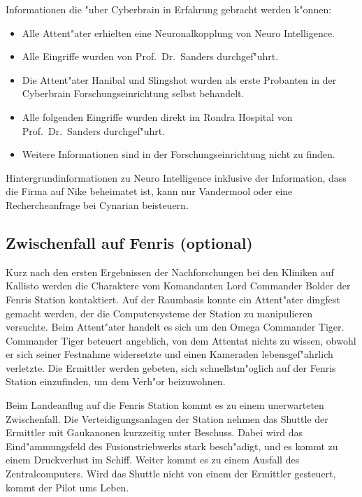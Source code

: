 Informationen die "uber Cyberbrain in Erfahrung gebracht werden k"onnen:
\begin{itemize}
	\item Alle Attent"ater erhielten eine Neuronalkopplung von Neuro Intelligence.
	\item Alle Eingriffe wurden von Prof.~Dr.~Sanders durchgef"uhrt.
	\item Die Attent"ater Hanibal und Slingshot wurden als erste Probanten in der Cyberbrain Forschungseinrichtung selbst behandelt.	
	\item Alle folgenden Eingriffe wurden direkt im Rondra Hospital von Prof.~Dr.~Sanders durchgef"uhrt.	
	\item Weitere Informationen sind in der Forschungseinrichtung nicht zu finden.	
\end{itemize}

\begin{remarks}
	Hintergrundinformationen zu Neuro Intelligence inklusive der Information, dass die Firma auf Nike beheimatet ist, kann nur Vandermool oder eine Rechercheanfrage bei Cynarian beisteuern.
\end{remarks}


\subsection{Zwischenfall auf Fenris (optional)}

Kurz nach den ersten Ergebnissen der Nachforschungen bei den Kliniken auf Kallisto werden die Charaktere vom Komandanten Lord Commander Bolder der Fenris Station kontaktiert. Auf der Raumbasis konnte ein Attent"ater dingfest gemacht werden, der die Computersysteme der Station zu manipulieren versuchte. Beim Attent"ater handelt es sich um den Omega Commander Tiger. Commander Tiger beteuert angeblich, von dem Attentat nichts zu wissen, obwohl er sich seiner Festnahme widersetzte und einen Kameraden lebensgef"ahrlich verletzte. Die Ermittler werden gebeten, sich schnellstm"oglich auf der Fenris Station einzufinden, um dem Verh"or beizuwohnen.

Beim Landeanflug auf die Fenris Station kommt es zu einem unerwarteten Zwischenfall. Die Verteidigungsanlagen der Station nehmen das Shuttle der Ermittler mit Gau\3kanonen kurzzeitig unter Beschuss. Dabei wird das Eind"ammungsfeld des Fusionstriebwerks stark besch"adigt, und es kommt zu einem Druckverlust im Schiff. Weiter kommt es zu einem Ausfall des Zentralcomputers. Wird das Shuttle nicht von einem der Ermittler gesteuert, kommt der Pilot ums Leben.


